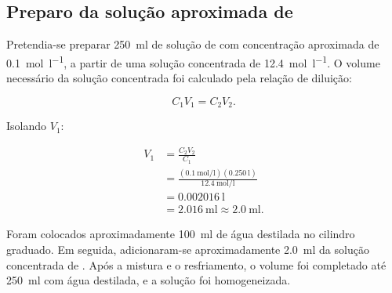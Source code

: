 \documentclass[a4paper,12pt]{article}
\begin{document}
\subsection{Preparo da solução aproximada de }

Pretendia-se preparar \qty{250}{\milli\litre} de solução de  com
concentração aproximada de \qty{0.1}{\mole\per\litre}, a partir de uma solução
concentrada de \qty{12.4}{\mole\per\litre}. O volume necessário da solução
concentrada foi calculado pela relação de diluição:

\begin{equation}
  C_1V_1=C_2V_2.
  \label{eq:diluicao}
\end{equation}

Isolando $V_1$:

\begin{align}
  V_1
    &=\frac{C_2V_2}{C_1} \nonumber\\
    &=\frac{
       \left(\qty{0.1}{\mole\per\litre}\right)
       \left(\qty{0.250}{\litre}\right)}
       {\qty{12.4}{\mole\per\litre}} \nonumber\\
    &=\qty{0.002016}{\litre} \nonumber\\
    &=\qty{2.016}{\milli\litre}
    \approx \boxed{\qty{2.0}{\milli\litre}}.
  \label{eq:volume_naoh_conc}
\end{align}

Foram colocados aproximadamente \qty{100}{\milli\litre} de água destilada no
cilindro graduado. Em seguida, adicionaram-se aproximadamente
\qty{2.0}{\milli\litre} da solução concentrada de . Após a mistura e
o resfriamento, o volume foi completado até \qty{250}{\milli\litre} com água
destilada, e a solução foi homogeneizada.
\end{document}
